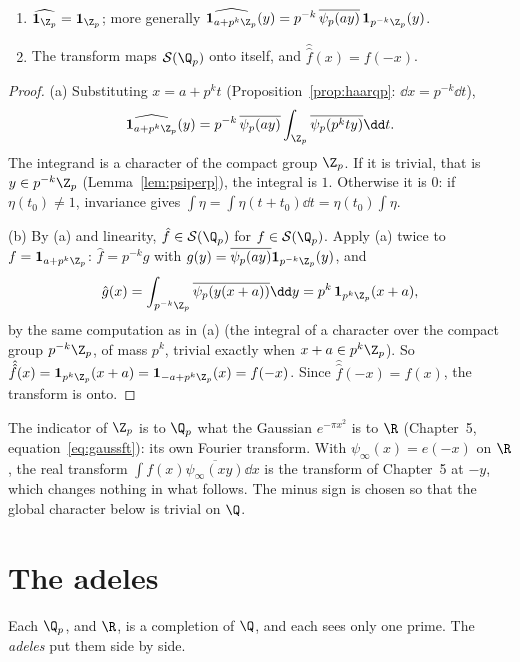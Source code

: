 \begin{theorem}\label{thm:qpfourier}
\begin{enumerate}
\item[(a)] $\widehat{\mathbf 1_{\Z_p}}=\mathbf 1_{\Z_p}$; more generally $\widehat{\mathbf 1_{a+p^k\Z_p}}(y)=p^{-k}\,\overline{\psi_p(ay)}\,\mathbf 1_{p^{-k}\Z_p}(y)$.
\item[(b)] The transform maps $\mathcal S(\Q_p)$ onto itself, and $\hat{\hat f}(x)=f(-x)$.
\end{enumerate}
\end{theorem}
\begin{proof}
(a) Substituting $x=a+p^kt$ (Proposition~\ref{prop:haarqp}: $\dd x=p^{-k}\dd t$),
\[\widehat{\mathbf 1_{a+p^k\Z_p}}(y)=p^{-k}\,\overline{\psi_p(ay)}\int_{\Z_p}\overline{\psi_p(p^kty)}\dd t.\]
The integrand is a character of the compact group $\Z_p$. If it is trivial, that is $y\in p^{-k}\Z_p$ (Lemma~\ref{lem:psiperp}), the integral is $1$. Otherwise it is $0$: if
$\eta(t_0)\ne1$, invariance gives $\int\eta=\int\eta(t+t_0)\dd t=\eta(t_0)\int\eta$.

(b) By (a) and linearity, $\hat f\in\mathcal S(\Q_p)$ for $f\in\mathcal S(\Q_p)$. Apply (a) twice to $f=\mathbf 1_{a+p^k\Z_p}$: $\hat f=p^{-k}g$ with $g(y)=\overline{\psi_p(ay)}\mathbf 1_{p^{-k}\Z_p}(y)$, and
\[\hat g(x)=\int_{p^{-k}\Z_p}\overline{\psi_p(y(x+a))}\dd y=p^k\,\mathbf 1_{p^k\Z_p}(x+a),\]
by the same computation as in (a) (the integral of a character over the compact group $p^{-k}\Z_p$, of mass $p^k$, trivial exactly when $x+a\in p^k\Z_p$). So
$\hat{\hat f}(x)=\mathbf 1_{p^k\Z_p}(x+a)=\mathbf 1_{-a+p^k\Z_p}(x)=f(-x)$. Since $\hat{\hat f}(-x)=f(x)$, the transform is onto.
\end{proof}

The indicator of $\Z_p$ is to $\Q_p$ what the Gaussian $e^{-\pi x^2}$ is to $\R$ (Chapter~5, equation~\eqref{eq:gaussft}): its own Fourier transform. With $\psi_\infty(x)=e(-x)$ on $\R$, the
real transform $\int f(x)\overline{\psi_\infty(xy)}\dd x$ is the transform of Chapter~5 at $-y$, which changes nothing in what follows. The minus sign is chosen so that
the global character below is trivial on $\Q$.

\section{The adeles}

Each $\Q_p$, and $\R$, is a completion of $\Q$, and each sees only one prime. The \emph{adeles} put them side by side.

